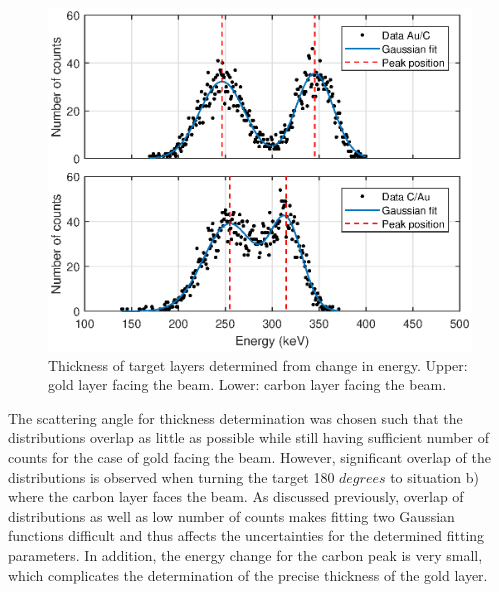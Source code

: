 \begin{figure}[t]
\centering
\includegraphics[width=0.99\columnwidth]{Dterminethicknessplot.eps}
\caption{Thickness of target layers determined from change in energy. Upper: gold layer facing the beam. Lower: carbon layer facing the beam.}
\label{fig_thickness}
\end{figure}

The scattering angle for thickness determination was chosen such that the distributions overlap as little as possible while still having sufficient number of counts for the case of gold facing the beam. However, significant overlap of the distributions is observed when turning the target 180 $\si{degrees}$ to situation b) where the carbon layer faces the beam. As discussed previously, overlap of distributions as well as low number of counts makes fitting two Gaussian functions difficult and thus affects the uncertainties for the determined fitting parameters.  In addition, the energy change for the carbon peak is very small, which complicates the determination of the precise thickness of the gold layer.








